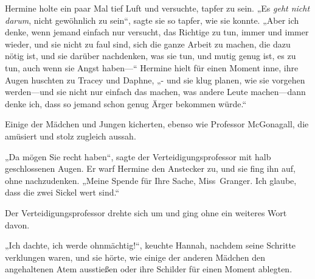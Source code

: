 Hermine holte ein paar Mal tief Luft und versuchte, tapfer zu sein. „Es \emph{geht nicht darum}, nicht gewöhnlich zu sein“, sagte sie so tapfer, wie sie konnte. „Aber ich denke, wenn jemand einfach nur versucht, das Richtige zu tun, immer und immer wieder, und sie nicht zu faul sind, sich die ganze Arbeit zu machen, die dazu nötig ist, und sie darüber nachdenken, was sie tun, und mutig genug ist, es zu tun, auch wenn sie Angst haben—“ Hermine hielt für einen Moment inne, ihre Augen huschten zu Tracey und Daphne, „- und sie klug planen, wie sie vorgehen werden—und sie nicht nur einfach das machen, was andere Leute machen—dann denke ich, dass so jemand schon genug Ärger bekommen würde.“

Einige der Mädchen und Jungen kicherten, ebenso wie Professor McGonagall, die amüsiert und stolz zugleich aussah.

„Da mögen Sie recht haben“, sagte der Verteidigungsprofessor mit halb geschlossenen Augen. Er warf Hermine den Anstecker zu, und sie fing ihn auf, ohne nachzudenken. „Meine Spende für Ihre Sache, Miss~Granger. Ich glaube, dass die zwei Sickel wert sind.“

Der Verteidigungsprofessor drehte sich um und ging ohne ein weiteres Wort davon.

„Ich dachte, ich werde ohnmächtig!“, keuchte Hannah, nachdem seine Schritte verklungen waren, und sie hörte, wie einige der anderen Mädchen den angehaltenen Atem ausstießen oder ihre Schilder für einen Moment ablegten.

